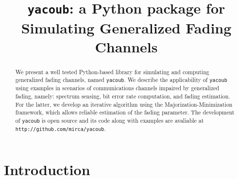 \documentclass[conference, 10pt]{IEEEtran}
\begin{document}
\title{\texttt{yacoub}: a Python package for Simulating Generalized Fading Channels}

\author{
}

\maketitle

\begin{abstract}
    We present a well tested Python-based library for simulating and computing
    generalized fading channels, named \texttt{yacoub}. We describe the
    applicability of \texttt{yacoub} using examples in scenarios of communications
    channels impaired by generalized fading, namely: spectrum sensing, bit error
    rate computation, and fading estimation. For the latter, we develop an iterative
    algorithm using the Majorization-Minimization framework, which allows reliable
    estimation of the fading parameter. The development of \texttt{yacoub} is open
    source and its code along with examples are avaliable at
    \texttt{http://github.com/mirca/yacoub}.
\end{abstract}

\IEEEpeerreviewmaketitle
\section{Introduction}
\end{document}
